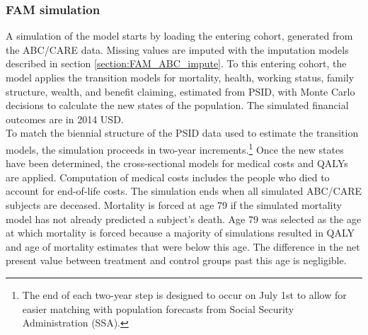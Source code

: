 %
%




\subsubsection{FAM simulation}

\noindent A simulation of the model starts by loading the entering cohort, generated from the ABC/CARE data. Missing values are imputed with the imputation models described in section \ref{section:FAM_ABC_impute}.  To this entering cohort, the model applies the transition models for mortality, health, working status, family structure, wealth, and benefit claiming, estimated from PSID, with Monte Carlo decisions to calculate the new states of the population.
The simulated financial outcomes are in 2014 USD. \\


\noindent To match the biennial structure of the PSID data used to estimate the transition models, the simulation proceeds in two-year increments.\footnote{The end of each two-year step is designed to occur on July 1st to allow for easier matching with population forecasts from Social Security Administration (SSA).}
Once the new states have been determined, the cross-sectional models for medical costs and QALYs are applied.
Computation of medical costs includes the people who died to account for end-of-life costs.
The simulation ends when all simulated ABC/CARE subjects are deceased. Mortality is forced at age 79 if the simulated mortality model has not already predicted a subject's death. Age 79 was selected as the age at which mortality is forced because a majority of simulations resulted in QALY and age of mortality estimates that were below this age. The difference in the net present value between treatment and control groups past this age is negligible.\\

